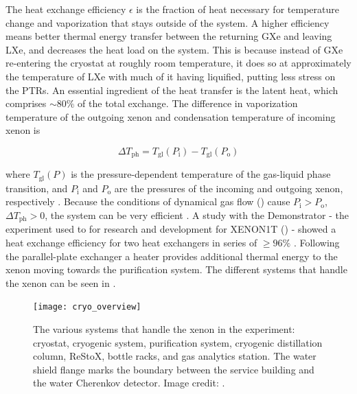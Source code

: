 The heat exchange
efficiency $\epsilon$ is the fraction of heat necessary for temperature change and vaporization that stays outside of the system.  A
higher efficiency means better thermal energy transfer between the returning GXe and leaving LXe, and decreases the heat load on the
system.  This is because instead of GXe re-entering the cryostat at roughly
room temperature, it does so at approximately the temperature of LXe with much of it having liquified, putting less stress on the
PTRs.  An essential ingredient of the heat transfer is the latent heat, which comprises ${\sim} 80\%$ of the total exchange.  The
difference in vaporization temperature of the outgoing xenon and condensation temperature of incoming xenon is

\begin{equation}
\Delta T_{\mathrm{ph}} = T_{\mathrm{gl}} (P_{\mathrm{i}}) - T_{\mathrm{gl}} (P_{\mathrm{o}})
\label{eq:xenon1t_cryo_latent}
\end{equation}

\noindent where $T_{\mathrm{gl}} (P)$ is the pressure-dependent temperature of the gas-liquid phase transition, and $P_{\mathrm{i}}$ and
$P_{\mathrm{o}}$ are the pressures of the incoming and outgoing xenon, respectively .  Because the conditions of
dynamical gas flow
() cause $P_{\mathrm{i}} > P_{\mathrm{o}}$, $\Delta T_{\mathrm{ph}} > 0$, the system can be very efficient
.  A study with the Demonstrator - the
experiment used to for research and development for XENON1T () - showed a heat
exchange efficiency for
two heat exchangers in series of $\geq 96\%$ .  Following the parallel-plate exchanger a heater provides additional
thermal energy to the xenon moving towards the purification system.  The different systems that handle the xenon can be seen in
.

\begin{figure}
\centering
\texttt{[image: cryo\_overview]}
\caption[The various systems that handle the xenon in the experiment: cryostat, cryogenic system, purification system, cryogenic distillation
column, ReStoX, bottle racks, and gas analytics station.]{The various systems that handle the xenon in the experiment: cryostat, cryogenic
system, purification system, cryogenic distillation
column, ReStoX, bottle racks, and gas analytics station.  The water shield flange marks the boundary between the service building and the
water Cherenkov detector.  Image credit: .}
\label{fig:xenon1t_cryo_overview}
\end{figure}



